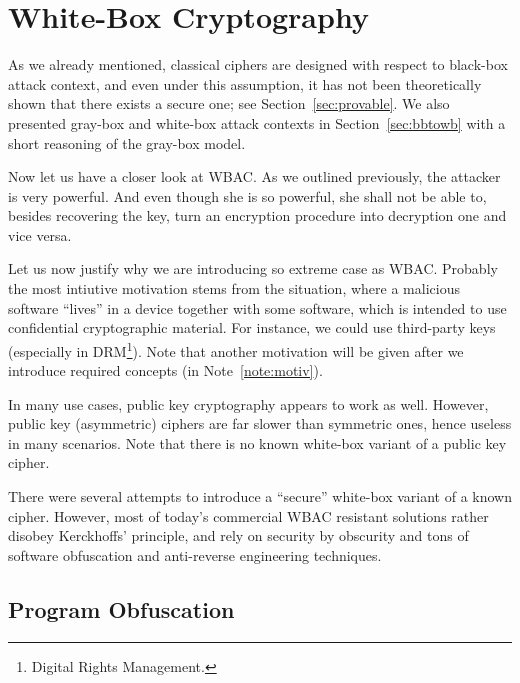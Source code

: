 \section{White-Box Cryptography}
\label{sec:wbc}

As we already mentioned, classical ciphers are designed with respect to black-box attack context, and even under this assumption, it has not been theoretically shown that there exists a secure one; see Section~\ref{sec:provable}. We also presented gray-box and white-box attack contexts in Section~\ref{sec:bbtowb} with a short reasoning of the gray-box model.

Now let us have a closer look at WBAC. As we outlined previously, the attacker is very powerful. And even though she is so powerful, she shall not be able to, besides recovering the key, turn an encryption procedure into decryption one and vice versa.

Let us now justify why we are introducing so extreme case as WBAC. Probably the most intiutive motivation stems from the situation, where a malicious software ``lives'' in a device together with some software, which is intended to use confidential cryptographic material. For instance, we could use third-party keys (especially in DRM\footnote{Digital Rights Management.}). Note that another motivation will be given after we introduce required concepts (in Note~\ref{note:motiv}).

In many use cases, public key cryptography appears to work as well. However, public key (asymmetric) ciphers are far slower than symmetric ones, hence useless in many scenarios. Note that there is no known white-box variant of a public key cipher.

There were several attempts to introduce a ``secure'' white-box variant of a known cipher. However, most of today's commercial WBAC resistant solutions rather disobey Kerckhoffs' principle, and rely on security by obscurity and tons of software obfuscation and anti-reverse engineering techniques.




\subsection{Program Obfuscation}
\label{sec:impos}

